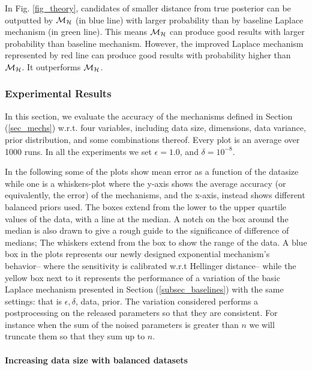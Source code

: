 \documentclass{article}
\begin{document}
In Fig. \ref{fig_theory}, candidates of smaller distance from true posterior can be outputted by $\mathcal{M}_{\mathcal{H}}$ (in blue line) with larger probability than by baseline Laplace mechanism (in green line). This means $\mathcal{M}_{\mathcal{H}}$ can produce good results with larger probability than baseline mechanism. However, the improved Laplace mechanism represented by red line can produce good results with probability higher than $\mathcal{M}_{\mathcal{H}}$. It outperforms $\mathcal{M}_{\mathcal{H}}$.


\subsubsection{Experimental Results}
\label{subsec_vs_variables}

In this section, we evaluate the accuracy of the mechanisms defined in
Section (\ref{sec_mechs}) w.r.t. four variables, including data size, dimensions,
data variance, prior distribution, and some combinations thereof.
Every plot is an average over 1000 runs. In all the experiments we set
$\epsilon = 1.0$, and $\delta = 10^{-8}$.

\noindent In the following some of the plots show
mean error as a function of the datasize while one
is a whiskers-plot where the y-axis shows the average
accuracy (or equivalently, the error) of the mechanisms, and the x-axis, instead shows
different balanced priors used. The boxes extend from the lower to the upper quartile values
of the data, with a line at the median. A notch on the box around the
median is also drawn to give a rough guide to the significance of
difference of medians; The whiskers extend from the box to show the
range of the data. A blue box in the plots represents our newly
designed exponential mechanism's behavior-- where the sensitivity is calibrated
w.r.t Hellinger distance-- while the yellow box next to
it represents the performance of a variation of the basic Laplace
mechanism presented in Section (\ref{subsec_baselines}) with the same
settings: that is $\epsilon, \delta$, data, prior. The variation
considered performs a postprocessing on the released parameters so
that they are consistent. For instance when the sum of the noised
parameters is greater than $n$ we will truncate them so that they sum
up to $n$.

\paragraph{Increasing data size with balanced datasets}
\label{subsubsec_vs_datasize}
\end{document}
